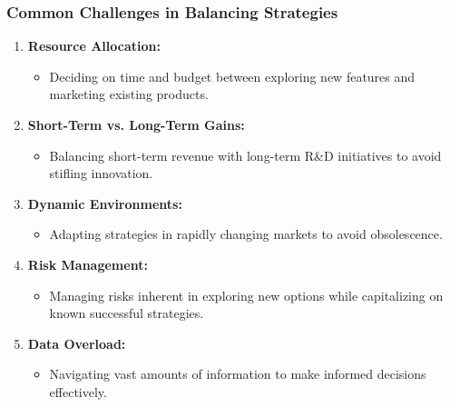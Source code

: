 \documentclass[aspectratio=169]{beamer}
\begin{document}
\begin{frame}[fragile]
    \frametitle{Common Challenges in Balancing Strategies}
    \begin{enumerate}
        \item \textbf{Resource Allocation:}
        \begin{itemize}
            \item Deciding on time and budget between exploring new features and marketing existing products.
        \end{itemize}
        
        \item \textbf{Short-Term vs. Long-Term Gains:}
        \begin{itemize}
            \item Balancing short-term revenue with long-term R\&D initiatives to avoid stifling innovation.
        \end{itemize}
        
        \item \textbf{Dynamic Environments:}
        \begin{itemize}
            \item Adapting strategies in rapidly changing markets to avoid obsolescence.
        \end{itemize}
        
        \item \textbf{Risk Management:}
        \begin{itemize}
            \item Managing risks inherent in exploring new options while capitalizing on known successful strategies.
        \end{itemize}
        
        \item \textbf{Data Overload:}
        \begin{itemize}
            \item Navigating vast amounts of information to make informed decisions effectively.
        \end{itemize}
    \end{enumerate}
\end{frame}
\end{document}
